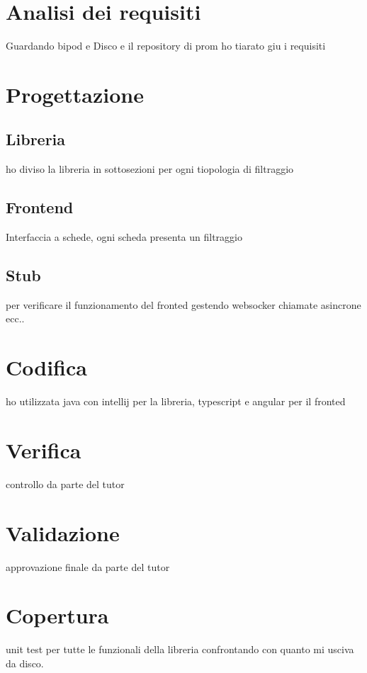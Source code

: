 \section{Analisi dei requisiti}
Guardando bipod e Disco e il repository di prom ho tiarato giu i requisiti
\section{Progettazione}
\subsection{Libreria}
ho diviso la libreria in sottosezioni per ogni tiopologia di filtraggio 
\subsection{Frontend}
Interfaccia a schede, ogni scheda presenta un filtraggio
\subsection{Stub}
per verificare il funzionamento del fronted gestendo websocker chiamate asincrone ecc..
\section{Codifica}
ho utilizzata java con intellij per la libreria, typescript e angular per il fronted
\section{Verifica}
controllo da parte del tutor
\section{Validazione}
approvazione finale da parte del tutor
\section{Copertura}
unit test per tutte le funzionali della libreria confrontando con quanto mi usciva da disco.